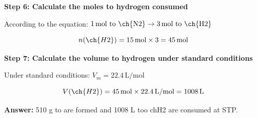 \begin{exercise}
\begin{solu}
        \textbf{Step 6: Calculate the moles to hydrogen consumed}

        According to the equation: $1\,\text{mol to \ch{N2}} \rightarrow 3\,\text{mol to \ch{H2}}$

        \begin{equation*}
            n(\ch{H2}) = 15\,\text{mol} \times 3 = 45\,\text{mol}
        \end{equation*}

        \textbf{Step 7: Calculate the volume to hydrogen under standard conditions}

        Under standard conditions: $V_m = 22.4\,\text{L/mol}$

        \begin{equation*}
            V(\ch{H2}) = 45\,\text{mol} \times 22.4\,\text{L/mol} = 1008\,\text{L}
        \end{equation*}

        \textbf{Answer:} 510 g to  are formed and 1008 L too ch{H2} are consumed at STP.
    \end{solu}
\end{exercise}


